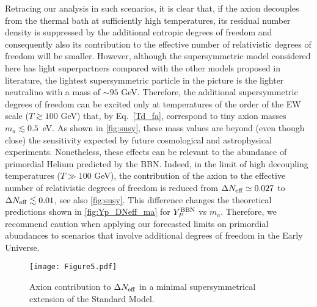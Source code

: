 \documentclass[fleqn,usenatbib,letters]{mnras}
\begin{document}
Retracing our analysis in such scenarios, it is clear that, if the axion decouples from the thermal bath at sufficiently high temperatures, its residual number density is suppressed by the additional entropic degrees of freedom and consequently also its contribution to the effective number of relativistic degrees of freedom will be smaller. However, although the supersymmetric model considered here has light superpartners compared with the other models proposed in literature, the lightest supersymmetric particle in the picture is the lighter neutralino with a mass of $\sim 95$ GeV. Therefore, the additional supersymmetric degrees of freedom can be excited only at temperatures of the order of the EW scale ($T\gtrsim 100$ GeV) that, by Eq.~\eqref{Td_fa}, correspond to tiny axion masses $m_a\lesssim 0.5$~eV. As shown in \autoref{fig:susy}, these mass values are beyond (even though close) the sensitivity expected by future cosmological and astrophysical experiments. Nonetheless, these effects can be relevant to the abundance of primordial Helium predicted by the BBN. Indeed, in the limit of high decoupling temperatures ($T\gg 100$ GeV), the contribution of the axion to the effective number of relativistic degrees of freedom is reduced from $\Delta N_{\rm eff}\simeq 0.027$ to $\Delta N_{\rm eff}\lesssim 0.01$, see also \autoref{fig:susy}. This difference changes the theoretical predictions shown in \autoref{fig:Yp_DNeff_ma} for $Y^{\rm BBN}_{P}$ vs $m_a$. Therefore, we recommend caution when applying our forecasted limits on primordial abundances to scenarios that involve additional degrees of freedom in the Early Universe.

\begin{figure}[htb]
    \centering
    \texttt{[image: Figure5.pdf]}
\caption{Axion contribution to $\Delta N_{\rm eff}$ in a minimal supersymmetrical extension of the Standard Model.}
\label{fig:susy}
\end{figure}
\bsp	%
\label{lastpage}
\end{document}

